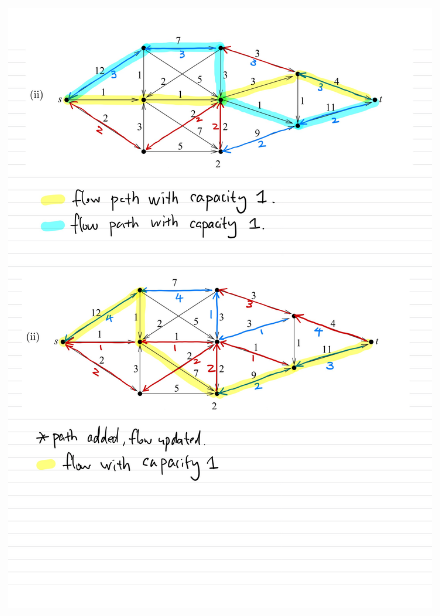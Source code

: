 \documentclass[]{article}
\theoremstyle{definition}
\begin{document}
    \newpage
    \begin{figure}
        \centering
        \includegraphics[width=16cm]{HW6-8.jpg}    
    \end{figure}
    
\end{document}
